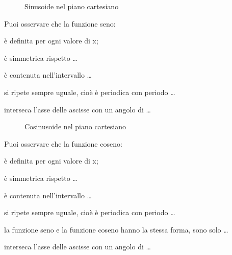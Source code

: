\begin{figure}[!h] 
 \vspace{-6pt}
  \begin{center}
\begin{inaccessibleblock}
    
    \caption{Sinusoide nel piano cartesiano}
    \label{fig:trigo_sin}
\end{inaccessibleblock}
  \end{center}
   \vspace{-24pt}
\end{figure} 
Puoi osservare che la funzione seno:
\begin{itemize*}
 \item è definita per ogni valore di x;
 \item è simmetrica rispetto \dots
 \item è contenuta nell'intervallo \dots
 \item si ripete sempre uguale, cioè è periodica con periodo \dots
 \item interseca l'asse delle ascisse con un angolo di \dots
\end{itemize*}
\begin{figure}[!h] 
 \vspace{-6pt}
  \begin{center}
  
\begin{inaccessibleblock}
    
    \caption{Cosinusoide nel piano cartesiano}
    \label{fig:trigo_sin}
\end{inaccessibleblock}
  \end{center}
   \vspace{-24pt}
\end{figure} 
Puoi osservare che la funzione coseno:
\begin{itemize*}
 \item è definita per ogni valore di x;
 \item è simmetrica rispetto \dots
 \item è contenuta nell'intervallo \dots
 \item si ripete sempre uguale, cioè è periodica con periodo \dots
 \item la funzione seno e la funzione coseno hanno la stessa forma,
  sono solo \dots
 \item interseca l'asse delle ascisse con un angolo di \dots
\end{itemize*}

